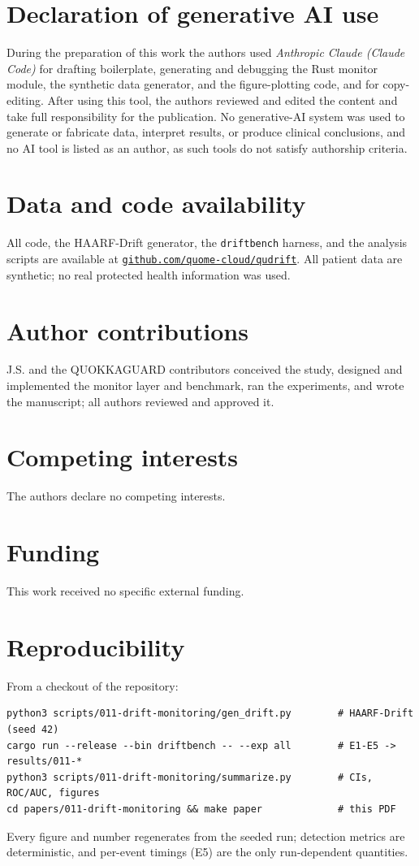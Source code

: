 \documentclass[11pt]{article}
\begin{document}
\section*{Declaration of generative AI use}
During the preparation of this work the authors used \emph{Anthropic Claude (Claude Code)}
for drafting boilerplate, generating and debugging the Rust monitor module, the synthetic
data generator, and the figure-plotting code, and for copy-editing. After using this tool,
the authors reviewed and edited the content and take full responsibility for the
publication. No generative-AI system was used to generate or fabricate data, interpret
results, or produce clinical conclusions, and no AI tool is listed as an author, as such
tools do not satisfy authorship criteria.

\section*{Data and code availability}
All code, the HAARF-Drift generator, the \texttt{driftbench} harness, and the analysis
scripts are available at
\href{https://github.com/quome-cloud/qudrift}{\nolinkurl{github.com/quome-cloud/qudrift}}.
All patient data are synthetic; no real protected health information was used.

\section*{Author contributions}
J.S. and the QUOKKAGUARD contributors conceived the study, designed and implemented the monitor layer and
benchmark, ran the experiments, and wrote the manuscript; all authors reviewed and approved
it.

\section*{Competing interests}
The authors declare no competing interests.

\section*{Funding}
This work received no specific external funding.

\appendix
\section{Reproducibility}\label{app:reproduce}
From a checkout of the repository:
\begin{lstlisting}[style=housespecyamlbare]
python3 scripts/011-drift-monitoring/gen_drift.py        # HAARF-Drift (seed 42)
cargo run --release --bin driftbench -- --exp all        # E1-E5 -> results/011-*
python3 scripts/011-drift-monitoring/summarize.py        # CIs, ROC/AUC, figures
cd papers/011-drift-monitoring && make paper             # this PDF
\end{lstlisting}
Every figure and number regenerates from the seeded run; detection metrics are
deterministic, and per-event timings (E5) are the only run-dependent quantities.

\clearpage


\end{document}
